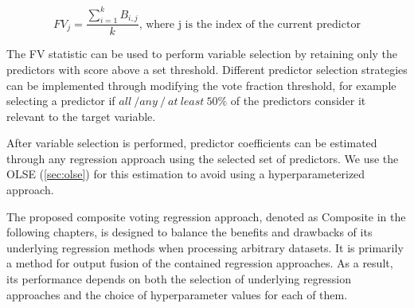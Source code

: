 \begin{equation} \label{eq:frac_votes}
FV_j = \frac{\sum_{i=1}^{k}B_{i,j}}{k}\text{, where j is the index of the current predictor} 
\end{equation}

The FV statistic can be used to perform variable selection by retaining only the predictors with score above a set threshold. Different predictor selection strategies can be implemented through modifying the vote fraction threshold, for example selecting a predictor if $all\ /any\ /\ at\ least\ 50\%$ of the predictors consider it relevant to the target variable. 

After variable selection is performed, predictor coefficients can be estimated through any regression approach using the selected set of predictors. We use the OLSE (\ref{sec:olse}) for this estimation to avoid using a hyperparameterized approach. 

The proposed composite voting regression approach, denoted as Composite in the following chapters, is designed to balance the benefits and drawbacks of its underlying regression methods when processing arbitrary datasets. It is primarily a method for output fusion of the contained regression approaches. As a result, its performance depends on both the selection of underlying regression approaches and the choice of hyperparameter values for each of them.
